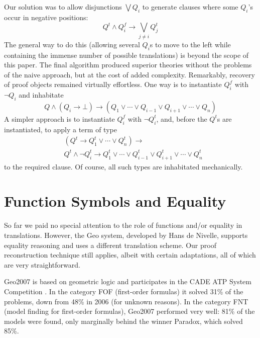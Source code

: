 \documentclass[a4paper,11pt]{article}
\begin{document}
Our solution was to allow disjunctions $\bigvee Q_i$ to generate clauses
where some $Q_i$'s occur in negative positions:
\[
Q^t \land Q^f_i \to 
\bigvee_{j \ne i} Q^t_j
\]
The general way to do this (allowing several $Q_i$s to move to the left while
containing the immense number of possible translations) is beyond the scope of
this paper.  The final algorithm produced superior theories 
without the problems of the
naive approach, but at the cost of added complexity.  Remarkably, recovery of
proof objects remained virtually effortless.  One way is to 
instantiate $Q^f_i$ with $\lnot Q_i$ and inhabitate
\[Q \land (Q_i \to \bot) \to 
(Q_1 \lor  \cdots \lor Q_{i-1} \lor Q_{i+1} \lor \cdots \lor Q_n)\]
A simpler approach is to instantiate $Q^f_i$ with $\lnot Q^t_i$, and, before
the $Q^t$s are instantiated, to apply a term of type 
\begin{align*}
&(Q^t \to Q^t_1 \lor \cdots \lor Q^t_n)
\to\\
&Q^t \land \lnot Q^t_i \to 
Q^t_1 \vee\cdots\vee Q^t_{i-1} \lor Q^t_{i+1} \vee\cdots\vee Q^t_n
\end{align*}
to the required clause.  Of course, all such types are inhabitated mechanically.

\newcommand{\ra}{\to}
\section{Function Symbols and Equality}
So far we paid no special attention to the role of functions and/or equality
in translations.  However, the Geo system, developed by Hans de Nivelle,
supports equality reasoning and uses a different translation
scheme.  Our proof reconstruction technique still applies, albeit with
certain adaptations, all of which are very straightforward.

Geo2007 is based on geometric logic and participates
in the CADE ATP System Competition \cite{CASC:06}.
In the category FOF (first-order formulas) it solved 31\% of
the problems, down from 48\% in 2006 (for unknown reasons).
In the category FNT (model finding for first-order formulas),
Geo2007 performed very well: 81\% of the models were found,
only marginally behind the winner Paradox, which solved 85\%.
\end{document}
